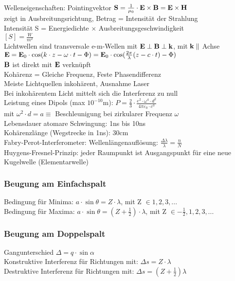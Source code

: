\documentclass[fs, footer]{latex4ei}
\begin{document}
\begin{multicols*}{4}
Welleneigenschaften: 
Pointingvektor $\textbf{S}=\frac{1}{\mu_0}\cdot \textbf{E} \times \textbf{B} = \textbf{E} \times \textbf{H}$ \\
zeigt in Ausbreitungsrichtung, Betrag = Intensität der Strahlung\\
Intensität S = Energiedichte $\times$ Ausbreitungsgeschwindigkeit\\
$[S]  = \frac{W}{m^2}$\\
Lichtwellen sind transversale e-m-Wellen mit $\textbf{E}\perp \textbf{B} \perp\textbf{k}$, mit $\textbf{k} \parallel$ Achse\\
$\textbf{E} = \textbf{E}_0\cdot\cos(k\cdot z - \omega\cdot t - \Phi) = \textbf{E}_0\cdot \cos(\frac{2\pi}{\lambda}(z-c\cdot t)-\Phi)$\\
$\textbf{B}$ ist direkt mit $\textbf{E}$ verknüpft\\
Kohärenz = Gleiche Frequenz, Feste Phasendifferenz\\
Meiste Lichtquellen inkohärent, Ausnahme Laser\\
Bei inkohärentem Licht mittelt sich die Interferenz zu null\\

Leistung eines Dipols (max $10^{-10}$m): $P = \frac{2}{3}\cdot\frac{e^2\cdot\omega^4\cdot d^2}{4\pi\varepsilon_0\cdot c^3}$\\
mit $\omega^2\cdot d = a \equiv$ Beschleunigung bei zirkularer Frequenz $\omega$\\ 
Lebensdauer atomare Schwingung: 1ns bis 10ns\\
Kohärenzlänge (Wegstrecke in 1ns): 30cm\\
Fabry-Perot-Interferometer: Wellenlängenauflösung: $\frac{\Delta \lambda}{\lambda} = \frac{n}{N}$\\
Huygens-Fresnel-Prinzip: jeder Raumpunkt ist Ausgangspunkt für eine neue Kugelwelle (Elementarwelle)\\

\subsubsection{Beugung am Einfachspalt}
Bedingung für Minima: $a\cdot\sin\theta = Z\cdot\lambda$, mit Z $\in 1,2,3,...$\\ %
Bedingung für Maxima: $a\cdot\sin\theta = (Z+\frac{1}{2})\cdot\lambda$, mit Z $\in -\frac{1}{2},1,2,3,...$\\%
\subsubsection{Beugung am Doppelspalt}
Gangunterschied $\Delta = q\cdot\sin\alpha$\\
Konstruktive Interferenz für Richtungen mit: $\Delta s = Z \cdot \lambda$\\
Destruktive Interferenz für Richtungen mit: $\Delta s = (Z+\frac{1}{2})\lambda$\\

\end{multicols*}
\end{document}
